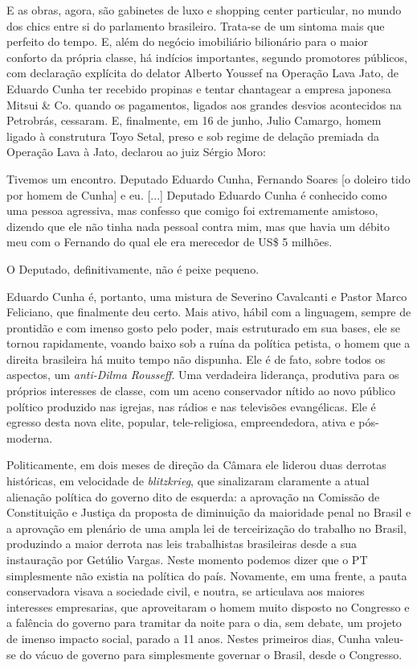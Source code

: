 E as obras, agora, são gabinetes de luxo e shopping center particular,
no mundo dos chics entre si do parlamento brasileiro. Trata-se de um
sintoma mais que perfeito do tempo. E, além do negócio imobiliário
bilionário para o maior conforto da própria classe, há indícios
importantes, segundo promotores públicos, com declaração explícita do
delator Alberto Youssef na Operação Lava Jato, de Eduardo Cunha ter
recebido propinas e tentar chantagear a empresa japonesa Mitsui \& Co.
quando os pagamentos, ligados aos grandes desvios acontecidos na
Petrobrás, cessaram. E, finalmente, em 16 de junho, Julio Camargo, homem
ligado à construtura Toyo Setal, preso e sob regime de delação premiada
da Operação Lava à Jato, declarou ao juiz Sérgio Moro:

Tivemos um encontro. Deputado Eduardo Cunha, Fernando Soares {[}o
doleiro tido por homem de Cunha{]} e eu. {[}...{]} Deputado Eduardo
Cunha é conhecido como uma pessoa agressiva, mas confesso que comigo foi
extremamente amistoso, dizendo que ele não tinha nada pessoal contra
mim, mas que havia um débito meu com o Fernando do qual ele era
merecedor de US\$ 5 milhões.

O Deputado, definitivamente, não é peixe pequeno.

Eduardo Cunha é, portanto, uma mistura de Severino Cavalcanti e Pastor
Marco Feliciano, que finalmente deu certo. Mais ativo, hábil com a
linguagem, sempre de prontidão e com imenso gosto pelo poder, mais
estruturado em sua bases, ele se tornou rapidamente, voando baixo sob a
ruína da política petista, o homem que a direita brasileira há muito
tempo não dispunha. Ele é de fato, sobre todos os aspectos, um
\emph{anti-Dilma Rousseff}. Uma verdadeira liderança, produtiva para os
próprios interesses de classe, com um aceno conservador nítido ao novo
público político produzido nas igrejas, nas rádios e nas televisões
evangélicas. Ele é egresso desta nova elite, popular, tele-religiosa,
empreendedora, ativa e pós-moderna.

Politicamente, em dois meses de direção da Câmara ele liderou duas
derrotas históricas, em velocidade de \emph{blitzkrieg}, que sinalizaram
claramente a atual alienação política do governo dito de esquerda: a
aprovação na Comissão de Constituição e Justiça da proposta de
diminuição da maioridade penal no Brasil e a aprovação em plenário de
uma ampla lei de terceirização do trabalho no Brasil, produzindo a maior
derrota nas leis trabalhistas brasileiras desde a sua instauração por
Getúlio Vargas. Neste momento podemos dizer que o PT simplesmente não
existia na política do país. Novamente, em uma frente, a pauta
conservadora visava a sociedade civil, e noutra, se articulava aos
maiores interesses empresarias, que aproveitaram o homem muito disposto
no Congresso e a falência do governo para tramitar da noite para o dia,
sem debate, um projeto de imenso impacto social, parado a 11 anos.
Nestes primeiros dias, Cunha valeu-se do vácuo de governo para
simplesmente governar o Brasil, desde o Congresso.

